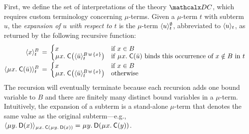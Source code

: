 First, we define the set of interpretations of the theory $\thD$,
which requires custom terminology concerning $\mu$-terms.
Given a $\mu$-term $t$ with subterm $u$,
the \emph{expansion of $u$ with respect to $t$} is the $\mu$-term $\expand{t}{u}^\emptyset$,
abbreviated to
$\expand{t}{u}$, as returned by the following recursive function:
\[\begin{array}{@{}r@{}c@{}l@{}}
\expand{t}{x}^B & {} \,=\, {} &
\textstyle\relax{\begin{cases}
    x & \text{if $x \in B$}   \\[-\jot]
    \MU x.\; \const{C}\smash{\bigl( \expand{t}{ \vec u}^{\smash{B \,\uplus\, \{ x \}}}\bigr)} & \text{if
    $\MU x.\; \const{C}( \vec u )$ binds this occurrence of $x \notin B$ in $t$}
\end{cases}} ~ \\
\expand{t}{\MU x.\; \const{C}( \vec u )}^B & = &
\textstyle\begin{cases}
    x & \text{if $x \in B$} \\[-\jot]
    \MU x.\; \const{C}\smash{\bigl( \expand{t}{ \vec u }^{\smash{B \,\uplus\, \{ x \}}}\bigr)} & \text{otherwise}
\end{cases}
\end{array}\]
The recursion will eventually terminate because each recursion adds one bound
variable to $B$ and there are finitely many distinct bound variables in a $\mu$-term.
Intuitively, the expansion of a subterm is a stand-alone
$\mu$-term that denotes the same value as the original subterm---e.g.,
$\expand{\MU x.\: \const{C}(\MU y.\: \const{D}(x))}{\MU y.\: \const{D}(x)} =
 \MU y.\: \const{D}(\MU x.\: \const{C}(y))$.
%

